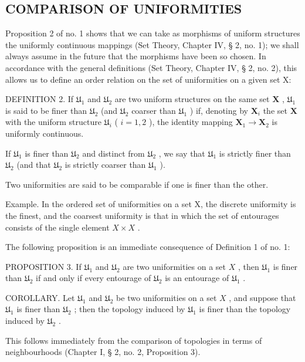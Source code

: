 \subsection{COMPARISON OF UNIFORMITIES}

Proposition 2 of no. 1 shows that we can take as morphisms of uniform structures the uniformly continuous mappings (Set Theory, Chapter IV, § 2, no. 1); we shall always assume in the future that the morphisms have been so chosen. In accordance with the general definitions (Set Theory, Chapter IV, § 2, no. 2), this allows us to define an order relation on the set of uniformities on a given set X:

DEFINITION 2. If \(\mathfrak{U}_1\) and \(\mathfrak{U}_2\) are two uniform structures on the same set \(\mathbf{X}\) , \(\mathfrak{U}_1\) is said to be finer than \(\mathfrak{U}_2\) (and \(\mathfrak{U}_2\) coarser than \(\mathfrak{U}_1\) ) if, denoting by \(\mathbf{X}_i\) the set \(\mathbf{X}\) with the uniform structure \(\mathfrak{U}_i\) ( \(i = 1,2\) ), the identity mapping \(\mathbf{X}_1 \to \mathbf{X}_2\) is uniformly continuous.

If \(\mathfrak{U}_1\) is finer than \(\mathfrak{U}_2\) and distinct from \(\mathfrak{U}_2\) , we say that \(\mathfrak{U}_1\) is strictly finer than \(\mathfrak{U}_2\) (and that \(\mathfrak{U}_2\) is strictly coarser than \(\mathfrak{U}_1\) ).

Two uniformities are said to be comparable if one is finer than the other.

Example. In the ordered set of uniformities on a set X, the discrete uniformity is the finest, and the coarsest uniformity is that in which the set of entourages consists of the single element \(X \times X\) .

The following proposition is an immediate consequence of Definition 1 of no. 1:

PROPOSITION 3. If \(\mathfrak{U}_1\) and \(\mathfrak{U}_2\) are two uniformities on a set \(X\) , then \(\mathfrak{U}_1\) is finer than \(\mathfrak{U}_2\) if and only if every entourage of \(\mathfrak{U}_2\) is an entourage of \(\mathfrak{U}_1\) .

COROLLARY. Let \(\mathfrak{U}_1\) and \(\mathfrak{U}_2\) be two uniformities on a set \(X\) , and suppose that \(\mathfrak{U}_1\) is finer than \(\mathfrak{U}_2\) ; then the topology induced by \(\mathfrak{U}_1\) is finer than the topology induced by \(\mathfrak{U}_2\) .

This follows immediately from the comparison of topologies in terms of neighbourhoods (Chapter I, § 2, no. 2, Proposition 3).

